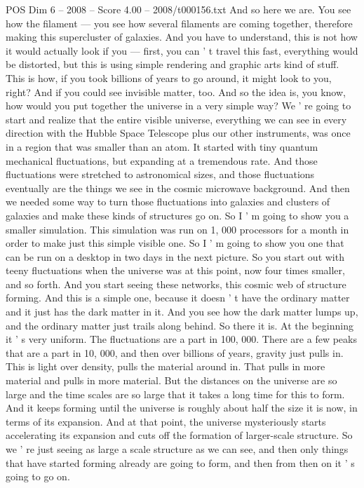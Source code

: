 \begin{textsample}{POS Dim 6 – 2008 – Score 4.00 – 2008/t000156.txt}
And so here we are.
You see how the filament — you see how several filaments are coming together, therefore making this supercluster of galaxies.
And you have to understand, this is not how it would actually look if you — first, you can ' t travel this fast, everything would be distorted, but this is using simple rendering and graphic arts kind of stuff.
This is how, if you took billions of years to go around, it might look to you, right?
And if you could see invisible matter, too.
And so the idea is, you know, how would you put together the universe in a very simple way?
We ' re going to start and realize that the entire visible universe, everything we can see in every direction with the Hubble Space Telescope plus our other instruments, was once in a region that was smaller than an atom.
It started with tiny quantum mechanical fluctuations, but expanding at a tremendous rate.
And those fluctuations were stretched to astronomical sizes, and those fluctuations eventually are the things we see in the cosmic microwave background.
And then we needed some way to turn those fluctuations into galaxies and clusters of galaxies and make these kinds of structures go on.
So I ' m going to show you a smaller simulation.
This simulation was run on 1, 000 processors for a month in order to make just this simple visible one.
So I ' m going to show you one that can be run on a desktop in two days in the next picture.
So you start out with teeny fluctuations when the universe was at this point, now four times smaller, and so forth.
And you start seeing these networks, this cosmic web of structure forming.
And this is a simple one, because it doesn ' t have the ordinary matter and it just has the dark matter in it.
And you see how the dark matter lumps up, and the ordinary matter just trails along behind.
So there it is.
At the beginning it ' s very uniform.
The fluctuations are a part in 100, 000.
There are a few peaks that are a part in 10, 000, and then over billions of years, gravity just pulls in.
This is light over density, pulls the material around in.
That pulls in more material and pulls in more material.
But the distances on the universe are so large and the time scales are so large that it takes a long time for this to form.
And it keeps forming until the universe is roughly about half the size it is now, in terms of its expansion.
And at that point, the universe mysteriously starts accelerating its expansion and cuts off the formation of larger-scale structure.
So we ' re just seeing as large a scale structure as we can see, and then only things that have started forming already are going to form, and then from then on it ' s going to go on.

\end{textsample}
